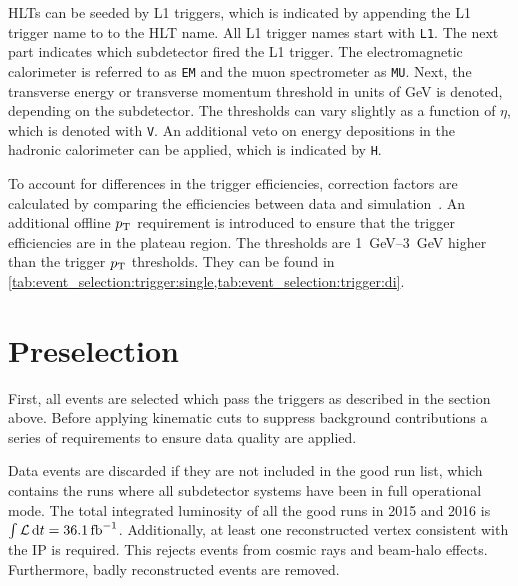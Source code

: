HLTs can be seeded by L1 triggers, which is indicated by appending the L1 trigger name to to the HLT name.
All L1 trigger names start with \texttt{L1}.
The next part indicates which subdetector fired the L1 trigger.
The electromagnetic calorimeter is referred to as \texttt{EM} and the muon spectrometer as \texttt{MU}.
Next, the transverse energy or transverse momentum threshold in units of GeV is denoted, depending on the subdetector.
The \et{} thresholds can vary slightly as a function of $\eta$, which is denoted with \texttt{V}.
An additional veto on energy depositions in the hadronic calorimeter can be applied, which is indicated by \texttt{H}.

To account for differences in the trigger efficiencies, correction factors are calculated by comparing
the efficiencies between data and simulation~\cite{Trigger2015,Trigger2016}.
An additional offline $p_\text{T}$ requirement is introduced to ensure that the trigger efficiencies are in the plateau region.
The thresholds are \SIrange{1}{3}{\GeV} higher than the trigger $p_\text{T}$ thresholds.
They can be found in \cref{tab:event_selection:trigger:single,tab:event_selection:trigger:di}.

\section{Preselection}\label{sec:event_selection:preselection}

First, all events are selected which pass the triggers as described in the section above.
Before applying kinematic cuts to suppress background contributions a series of requirements to
ensure data quality are applied.

Data events are discarded if they are not included in the good run list,
which contains the runs where all subdetector systems have been in full operational mode.
The total integrated luminosity of all the good runs in 2015 and 2016 is $\lumiint = \SI{36.1}{\invfb}$.
Additionally, at least one reconstructed vertex consistent with the IP is required.
This rejects events from cosmic rays and beam-halo effects.
Furthermore, badly reconstructed events are removed.

